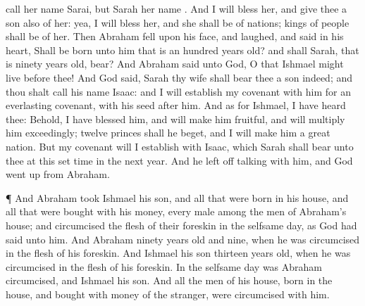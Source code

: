 {call her
name
Sarai,
but
Sarah
{} her
name
{}.
And I will
bless her, and
give thee a
son also of her: yea, I will
bless her, and she shall be
{} of
nations;
kings of
people shall be of her.
Then
Abraham
fell upon his
face, and
laughed, and
said in his
heart, Shall
{} be
born unto him that is an
hundred
years
old? and shall
Sarah, that is
ninety
years
old,
bear?
And
Abraham
said unto
God, O
that
Ishmael might
live before
thee!
And
God
said,
Sarah thy
wife shall
bear thee a
son
indeed; and thou shalt
call his
name
Isaac: and I will
establish my
covenant with him for an
everlasting
covenant,
{} with his
seed after
him.
And as for
Ishmael, I have heard
thee: Behold, I have
blessed him, and will make him
fruitful, and will
multiply him
exceedingly;
twelve
princes shall he
beget, and I will make
him a
great
nation.
But my
covenant will I
establish with
Isaac, which
Sarah shall
bear unto thee at this set
time in the
next
year.
And he left
off
talking with him, and
God went
up from
Abraham.
\par }{\PP {}¶ And
Abraham
took
Ishmael his
son, and all that were
born in his
house, and all that were
bought with his
money, every
male among the
men of
Abraham’s
house; and
circumcised the
flesh of their
foreskin in the
selfsame
day, as
God had
said unto him.
And
Abraham
{}
ninety
years
old and
nine, when he was
circumcised in the
flesh of his
foreskin.
And
Ishmael his
son
{}
thirteen
years
old, when he was
circumcised in the
flesh of his
foreskin.
In the
selfsame
day was
Abraham
circumcised, and
Ishmael his
son.
And all the
men of his
house,
born in the
house, and
bought with
money of the
stranger, were
circumcised with him.

}
